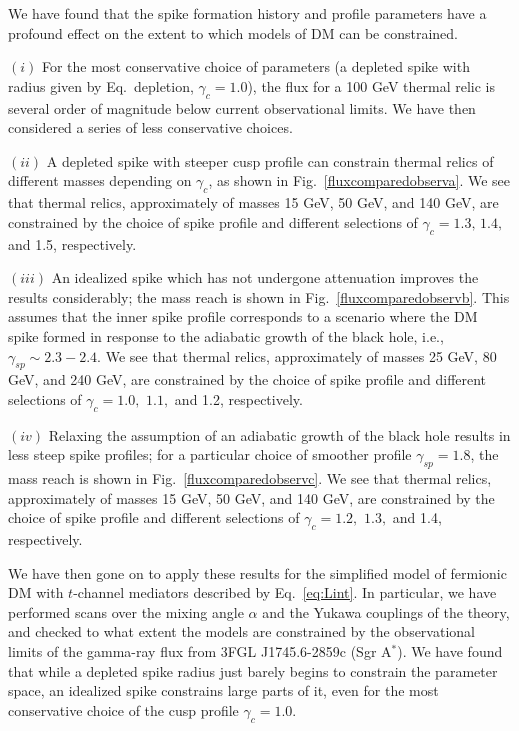 \documentclass[11pt]{article}
\begin{document}
We have found that the spike formation history and profile parameters have a profound effect on the extent to which models of DM can be constrained. 

$(i)$ For the most conservative choice of parameters (a depleted spike with radius given by Eq.~{depletion}, $\gamma_{c} = 1.0$), the flux for a 100 GeV thermal relic is several order of magnitude below current observational limits. We have then considered a series of less conservative choices. 

$(ii)$ A depleted spike with steeper cusp profile can constrain thermal relics of different masses depending on $\gamma_c$, as shown in Fig.~\ref{fluxcomparedobserva}. We see that thermal relics, approximately of masses 15 GeV, 50 GeV, and 140 GeV, are constrained by the choice of spike profile and different selections of $\gamma_c = 1.3, \, 1.4, \,$ and 1.5, respectively.

$(iii)$ An idealized spike which has not undergone attenuation improves the results considerably; the mass reach is shown in Fig.~\ref{fluxcomparedobservb}. This assumes that the inner spike profile corresponds to a scenario where the DM spike formed in response to the adiabatic growth of the black hole, i.e., $\gamma_{sp} \sim 2.3 - 2.4$. We see that thermal relics, approximately of masses 25 GeV, 80 GeV, and 240 GeV, are constrained by the choice of spike profile and different selections of $\gamma_c = 1.0, \,\, 1.1,$ and 1.2, respectively.

$(iv)$ Relaxing the assumption of an adiabatic growth of the black hole results in less steep spike profiles; for a particular choice of smoother profile $\gamma_{sp} = 1.8$, the mass reach is shown in Fig.~\ref{fluxcomparedobservc}. We see that thermal relics, approximately of masses 15 GeV, 50 GeV, and 140 GeV, are constrained by the choice of spike profile and different selections of $\gamma_c = 1.2, \,\, 1.3,$ and 1.4, respectively.

We have then gone on to apply these results for the simplified model of fermionic DM with $t$-channel mediators described by Eq.~\ref{eq:Lint}. In particular, we have performed scans over the mixing angle $\alpha$ and the Yukawa couplings of the theory, and checked to what extent the models are constrained by the observational limits of the gamma-ray flux from 3FGL J1745.6-2859c (Sgr A$^*$). We have found that while a depleted spike radius just barely begins to constrain the parameter space, an idealized spike constrains large parts of it, even for the most conservative choice of the cusp profile $\gamma_c = 1.0$.
\end{document}
